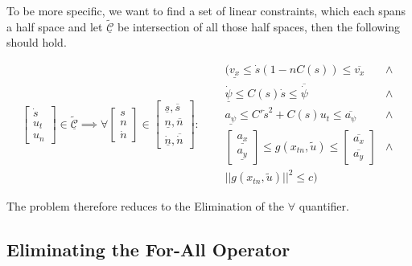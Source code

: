 To be more specific, we want to find a set of linear constraints, which each spans a half space and let $\tilde{\underline{\mathcal{C}}}$ be
intersection of all those half spaces, then the following should hold.

\begin{equation}
	\label{eq:forall_formula}
	\begin{bmatrix}
		\dot{s} \\
		u_t     \\
		u_n
	\end{bmatrix} \in \tilde{\underline{\mathcal{C}}}
	\implies
	\forall  \begin{bmatrix}
		s \\
		n \\
		\dot{n}
	\end{bmatrix} \in \begin{bmatrix}
		\underline{s}, \overline{s} \\
		\underline{n}, \overline{n} \\
		\underline{\dot{n}},  \overline{\dot{n}}
	\end{bmatrix}: \quad
	\begin{aligned}
		 & (\underline{v_x}  \leq  \dot{s}(1-nC(s))  \leq  \overline{v_x}             & \land \\
		 & \underline{\dot{\psi}} \leq C(s) \dot{s} \leq \overline{\dot{\psi}}        & \land \\
		 & \underline{a_{\psi}} \leq C' \dot{s}^2 + C(s) u_t \leq \overline{a_{\psi}} & \land \\
		 & \begin{bmatrix}
			   \underline{a_x} \\ \underline{a_y}
		   \end{bmatrix} \leq g(x_{tn}, \tilde{u}) \leq \begin{bmatrix}
			                                                \overline{a_x} \\\overline{a_y}
		                                                \end{bmatrix}               & \land   \\
		 & ||g(x_{tn}, \tilde{u})||^2 \leq c )
	\end{aligned}
\end{equation}

The problem therefore reduces to the Elimination of the $\forall$ quantifier.

\subsection{Eliminating the For-All Operator} \label{subsec:eliminating_the_for_all_operator}
